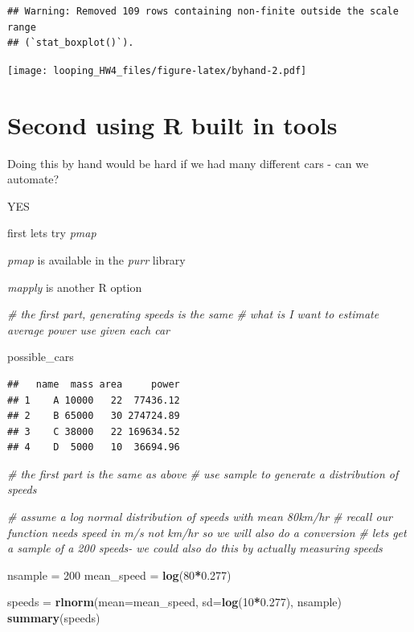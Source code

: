 \documentclass[
]{article}
\newenvironment{Shaded}{\begin{snugshade}}{\end{snugshade}}
\newcommand{\AttributeTok}[1]{\textcolor[rgb]{0.13,0.29,0.53}{#1}}
\newcommand{\CommentTok}[1]{\textcolor[rgb]{0.56,0.35,0.01}{\textit{#1}}}
\newcommand{\DecValTok}[1]{\textcolor[rgb]{0.00,0.00,0.81}{#1}}
\newcommand{\FloatTok}[1]{\textcolor[rgb]{0.00,0.00,0.81}{#1}}
\newcommand{\FunctionTok}[1]{\textcolor[rgb]{0.13,0.29,0.53}{\textbf{#1}}}
\newcommand{\NormalTok}[1]{#1}
\newcommand{\OtherTok}[1]{\textcolor[rgb]{0.56,0.35,0.01}{#1}}
\newcommand{\SpecialCharTok}[1]{\textcolor[rgb]{0.81,0.36,0.00}{\textbf{#1}}}
\begin{document}
\begin{verbatim}
## Warning: Removed 109 rows containing non-finite outside the scale range
## (`stat_boxplot()`).
\end{verbatim}

\texttt{[image: looping\_HW4\_files/figure-latex/byhand-2.pdf]}

\section{Second using R built in
tools}\label{second-using-r-built-in-tools}

Doing this by hand would be hard if we had many different cars - can we
automate?

YES

first lets try \emph{pmap}

\emph{pmap} is available in the \emph{purr} library

\emph{mapply} is another R option

\begin{Shaded}
\begin{Highlighting}[]
\CommentTok{\# the first part, generating speeds is the same}
\CommentTok{\# what is I want to estimate average power use given  each car}

\NormalTok{possible\_cars}
\end{Highlighting}
\end{Shaded}

\begin{verbatim}
##   name  mass area     power
## 1    A 10000   22  77436.12
## 2    B 65000   30 274724.89
## 3    C 38000   22 169634.52
## 4    D  5000   10  36694.96
\end{verbatim}

\begin{Shaded}
\begin{Highlighting}[]
\CommentTok{\# the first part is the same as above}
\CommentTok{\# use sample to generate a distribution of speeds}

\CommentTok{\# assume a log normal distribution of speeds with mean 80km/hr}
\CommentTok{\# recall our function needs speed in m/s not km/hr so we will also do a conversion}
\CommentTok{\# lets get a sample of a 200 speeds{-} we could also do this by actually measuring speeds}

\NormalTok{nsample }\OtherTok{=} \DecValTok{200}
\NormalTok{mean\_speed }\OtherTok{=} \FunctionTok{log}\NormalTok{(}\DecValTok{80}\SpecialCharTok{*}\FloatTok{0.277}\NormalTok{)}

\NormalTok{speeds }\OtherTok{=} \FunctionTok{rlnorm}\NormalTok{(}\AttributeTok{mean=}\NormalTok{mean\_speed, }\AttributeTok{sd=}\FunctionTok{log}\NormalTok{(}\DecValTok{10}\SpecialCharTok{*}\FloatTok{0.277}\NormalTok{), nsample)}
\FunctionTok{summary}\NormalTok{(speeds)}
\end{Highlighting}
\end{Shaded}
\end{document}
